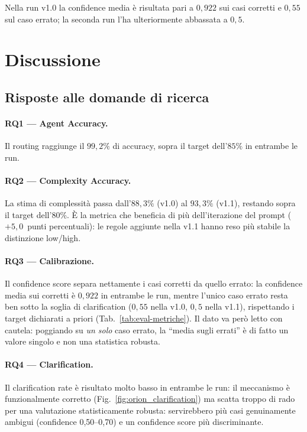 Nella run v1.0 la confidence media è risultata pari a $0{,}922$ sui casi corretti e $0{,}55$ sul caso errato;
la seconda run l'ha ulteriormente abbassata a $0{,}5$.

\section{Discussione}
\label{sec:eval-discussione}

\subsection{Risposte alle domande di ricerca}
\label{subsec:eval-rq}

\paragraph{RQ1 --- Agent Accuracy.} Il routing raggiunge il $99{,}2\%$ di accuracy, 
sopra il target dell'$85\%$ in entrambe le run.

\paragraph{RQ2 --- Complexity Accuracy.} La stima di complessità passa dall'$88{,}3\%$ (v1.0) al $93{,}3\%$ (v1.1), 
restando sopra il target dell'$80\%$. È la metrica che beneficia di più dell'iterazione del prompt ($+5{,}0$~punti percentuali): 
le regole aggiunte nella v1.1 hanno reso più stabile la distinzione low/high.

\paragraph{RQ3 --- Calibrazione.} Il confidence score separa nettamente i casi corretti da quello errato:
la confidence media sui corretti è $0{,}922$ in entrambe le run, mentre l'unico caso errato resta ben sotto la soglia di clarification ($0{,}55$ nella v1.0, $0{,}5$ nella v1.1),
rispettando i target dichiarati a priori (Tab.~\ref{tab:eval-metriche}). Il dato va però letto con cautela: poggiando su \emph{un solo} caso errato, la ``media sugli errati'' è di fatto un valore singolo e non una statistica robusta.

\paragraph{RQ4 --- Clarification.} Il clarification rate è risultato molto basso in entrambe le run: il meccanismo è funzionalmente corretto (Fig.~\ref{fig:orion_clarification}) 
ma scatta troppo di rado per una valutazione statisticamente robusta: servirebbero più casi genuinamente ambigui (confidence 0,50--0,70) e un confidence score più discriminante.


